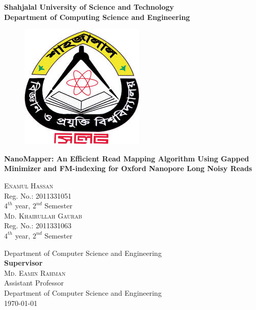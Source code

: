 \documentclass{standalone}
\begin{document}
\begin{titlepage}

\begin{center}
				{\huge \bf Shahjalal University of Science and Technology}\\
				{\LARGE \bf Department of Computing Science and Engineering}
				\vfill
        \begin{figure}[h]
				\centering
				\includegraphics[scale=0.6]{./img/varsityLogo}
				\end{figure}

				\vfill
				{\LARGE \bf NanoMapper: An Efficient Read Mapping Algorithm Using Gapped Minimizer and FM-indexing for Oxford Nanopore Long Noisy Reads}\\
        \begin{multicols}{2}
        \textsc{\Large Enamul Hassan }\\
        Reg. No.: 2011331051\\ $4^{th}$ year, $2^{nd}$ Semester\\
				\textsc{\Large Md. Khairullah Gaurab} \\
        Reg. No.: 2011331063\\ $4^{th}$ year, $2^{nd}$ Semester
				\end{multicols}
				Department of Computer Science and Engineering\\
				\vfill
        {\bf Supervisor}\\
				\textsc{\Large Md. Eamin Rahman} \\
        Assistant Professor\\ 
				Department of Computer Science and Engineering\\
        \vfill
        \today
        

\end{center}
\end{titlepage}
\end{document}
